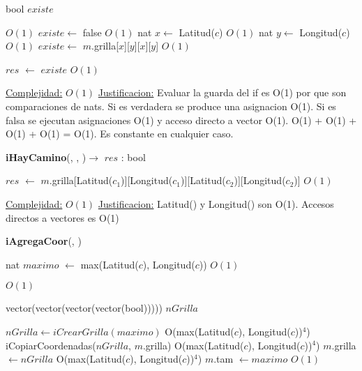 \begin{Algoritmos}
\begin{algorithm}[H]
\begin{algorithmic}[1]
\State bool $existe$

 \Comment $O(1)$
	\State $existe \gets$ false \Comment $O(1)$
\Else
	\State nat $x \gets$ Latitud($c$) \Comment $O(1)$
	\State nat $y \gets$ Longitud($c$) \Comment $O(1)$
	\State $existe \gets$ $m$.grilla[$x$][$y$][$x$][$y$] \Comment $O(1)$
\EndIf

\State $res$ $\gets$ $existe$ \Comment $O(1)$

\medskip
\Statex \underline{Complejidad:} $O(1)$
\Statex \underline{Justificacion:} Evaluar la guarda del if es O(1) por que son comparaciones de nats. Si es verdadera se produce una asignacion O(1). Si es falsa se ejecutan asignaciones O(1) y acceso directo a vector O(1). O(1) + O(1) + O(1) + O(1) = O(1). Es constante en cualquier caso.

\end{algorithmic}
\end{algorithm}


\begin{algorithm}[H]
{\textbf{iHayCamino}(, , )$\to$ $res$ : bool}
\begin{algorithmic}[1]

\State $res$ $\gets$ $m$.grilla[Latitud($c_1$)][Longitud($c_1$)][Latitud($c_2$)][Longitud($c_2$)] \Comment $O(1)$

\medskip
\Statex \underline{Complejidad:} $O(1)$
\Statex \underline{Justificacion:} Latitud() y Longitud() son O(1). Accesos directos a vectores es O(1)

\end{algorithmic}
\end{algorithm}


{\textbf{iAgregaCoor}(, )}
\begin{algorithmic}[1]

\State nat $maximo$ $\gets$ max(Latitud($c$), Longitud($c$))  \Comment $O(1)$

\State {} \Comment $O(1)$

\State vector(vector(vector(vector(bool))))) $nGrilla$

\State $nGrilla \gets iCrearGrilla(maximo)$ \Comment O(max(Latitud($c$), Longitud($c$))$^4$)
\State iCopiarCoordenadas($nGrilla$, $m$.grilla) \Comment O(max(Latitud($c$), Longitud($c$))$^4$)
\State $m$.grilla $\gets nGrilla$ \Comment O(max(Latitud($c$), Longitud($c$))$^4$)
\State $m$.tam $\gets maximo$ \Comment $O(1)$


\end{algorithmic}
\end{Algoritmos}

